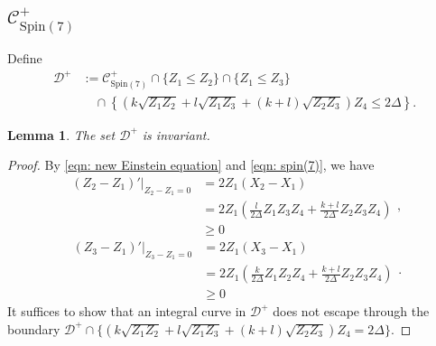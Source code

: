 \documentclass[11pt,letterpaper]{amsart}
\newtheorem{lemma}[theorem]{Lemma}
\theoremstyle{definition}
\numberwithin{equation}{section}
\newcommand{\spin}{\mathrm{Spin}}
\begin{document}
\subsection{$\mathcal{C}^+_{\spin(7)}$}
\label{subsec_+}
Define 
\begin{equation}
\label{eqn_D+}
\begin{split}
\mathcal{D}^+&:=\mathcal{C}^+_{\spin(7)}\cap \{Z_1\leq  Z_2\}\cap \{Z_1\leq  Z_3\}\\
&\quad \cap \left\{\left(k\sqrt{Z_1Z_2}+l\sqrt{Z_1Z_3}+(k+l)\sqrt{Z_2Z_3}\right)Z_4\leq 2\Delta\right\}.
\end{split}
\end{equation}
\begin{lemma}
\label{lem: invariant+}
The set $\mathcal{D}^+$ is invariant.
\end{lemma}
\begin{proof}
By \eqref{eqn: new Einstein equation} and \eqref{eqn: spin(7)}, we have 
\begin{equation}
\label{eqn: Z1<Z2}
\begin{split}
\left.(Z_2-Z_1)'\right|_{Z_2-Z_1=0}&=2Z_1(X_2-X_1)\\
&=2Z_1\left(\frac{l}{2\Delta}Z_1Z_3Z_4+\frac{k+l}{2\Delta}Z_2Z_3Z_4\right)\\
&\geq 0
\end{split},
\end{equation}
\begin{equation}
\label{eqn: Z1<Z3}
\begin{split}
\left.(Z_3-Z_1)'\right|_{Z_3-Z_1=0}&=2Z_1(X_3-X_1)\\
&=2Z_1\left(\frac{k}{2\Delta}Z_1Z_2Z_4+\frac{k+l}{2\Delta}Z_2Z_3Z_4\right)\\
&\geq 0
\end{split}.
\end{equation}
It suffices to show that an integral curve in $\mathcal{D}^+$ does not escape through the boundary $\mathcal{D}^+\cap \{\left(k\sqrt{Z_1Z_2}+l\sqrt{Z_1Z_3}+(k+l)\sqrt{Z_2Z_3}\right)Z_4= 2\Delta\}$.


\end{proof}
\end{document}
